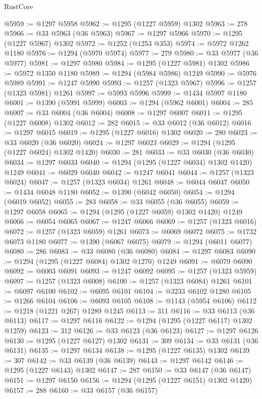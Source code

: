 \begin{lexlean}{RustCore}
\begin{coremodule}
@5959 := @1297 @5958
@5962 := @1295 (@1227 @5959) @1302
@5963 := 278
@5966 := @33 @5963 (@36 @5963)
@5967 := @1297 @5966
@5970 := @1295 (@1227 @5967) @1302
@5972 := @1252 (@1253 @353)
@5974 := @5972 @1262 @1180
@5976 := @1294 (@5970 @5974)
@5977 := 279
@5980 := @33 @5977 (@36 @5977)
@5981 := @1297 @5980
@5984 := @1295 (@1227 @5981) @1302
@5986 := @5972 @1350 @1180
@5989 := @1294 (@5984 @5986) @1249
@5990 := @5976 @5989
@5991 := @1247 @5990
@5993 := @1257 (@1323 @5967)
@5996 := @1257 (@1323 @5981) @1261
@5997 := @5993 @5996
@5999 := @1434 @5997 @1180
@6001 := @1390 (@5991 @5999)
@6003 := @1294 (@5962 @6001)
@6004 := 285
@6007 := @33 @6004 (@36 @6004)
@6008 := @1297 @6007
@6011 := @1295 (@1227 @6008) @1302
@6012 := 282
@6015 := @33 @6012 (@36 @6012)
@6016 := @1297 @6015
@6019 := @1295 (@1227 @6016) @1302
@6020 := 280
@6023 := @33 @6020 (@36 @6020)
@6024 := @1297 @6023
@6029 := @1294 (@1295 (@1227 @6024) @1302 @1420)
@6030 := 281
@6033 := @33 @6030 (@36 @6030)
@6034 := @1297 @6033
@6040 := @1294 (@1295 (@1227 @6034) @1302 @1420) @1249
@6041 := @6029 @6040
@6042 := @1247 @6041
@6044 := @1257 (@1323 @6024)
@6047 := @1257 (@1323 @6034) @1261
@6048 := @6044 @6047
@6050 := @1434 @6048 @1180
@6052 := @1390 (@6042 @6050)
@6054 := @1294 (@6019 @6052)
@6055 := 283
@6058 := @33 @6055 (@36 @6055)
@6059 := @1297 @6058
@6065 := @1294 (@1295 (@1227 @6059) @1302 @1420) @1249
@6066 := @6054 @6065
@6067 := @1247 @6066
@6069 := @1257 (@1323 @6016)
@6072 := @1257 (@1323 @6059) @1261
@6073 := @6069 @6072
@6075 := @1732 @6073 @1180
@6077 := @1390 (@6067 @6075)
@6079 := @1294 (@6011 @6077)
@6080 := 286
@6083 := @33 @6080 (@36 @6080)
@6084 := @1297 @6083
@6090 := @1294 (@1295 (@1227 @6084) @1302 @1270) @1249
@6091 := @6079 @6090
@6092 := @6003 @6091
@6093 := @1247 @6092
@6095 := @1257 (@1323 @5959)
@6097 := @1257 (@1323 @6008)
@6100 := @1257 (@1323 @6084) @1261
@6101 := @6097 @6100
@6102 := @6095 @6101
@6104 := @3233 @6102 @1280
@6105 := @1266 @6104
@6106 := @6093 @6105
@6108 := @1143 (@5954 @6106)
@6112 := @1218 (@1221 @267) @1289 @1245
@6113 := 311
@6116 := @33 @6113 (@36 @6113)
@6117 := @1297 @6116
@6122 := @1294 (@1295 (@1227 @6117) @1302 @1259)
@6123 := 312
@6126 := @33 @6123 (@36 @6123)
@6127 := @1297 @6126
@6130 := @1295 (@1227 @6127) @1302
@6131 := 309
@6134 := @33 @6131 (@36 @6131)
@6135 := @1297 @6134
@6138 := @1295 (@1227 @6135) @1302
@6139 := 307
@6142 := @33 @6139 (@36 @6139)
@6143 := @1297 @6142
@6146 := @1295 (@1227 @6143) @1302
@6147 := 287
@6150 := @33 @6147 (@36 @6147)
@6151 := @1297 @6150
@6156 := @1294 (@1295 (@1227 @6151) @1302 @1420)
@6157 := 288
@6160 := @33 @6157 (@36 @6157)

\end{coremodule}
\end{lexlean}
